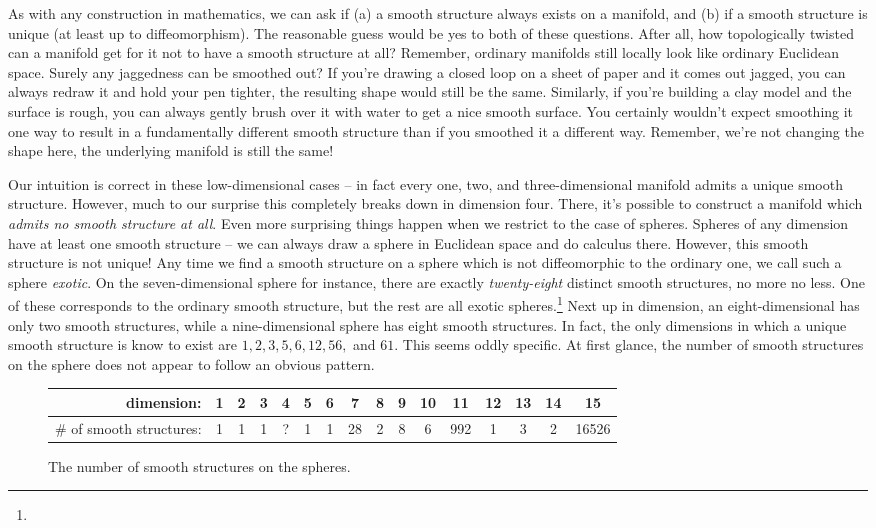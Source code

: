 As with any construction in mathematics, we can ask if (a) a smooth structure always exists on a manifold, and (b) if a smooth structure is unique (at least up to diffeomorphism). The reasonable guess would be yes to both of these questions. After all, how topologically twisted can a manifold get for it not to have a smooth structure at all? Remember, ordinary manifolds still locally look like ordinary Euclidean space. Surely any jaggedness can be smoothed out? If you're drawing a closed loop on a sheet of paper and it comes out jagged, you can always redraw it and hold your pen tighter, the resulting shape would still be the same. Similarly, if you're building a clay model and the surface is rough, you can always gently brush over it with water to get a nice smooth surface. You certainly wouldn't expect smoothing it one way to result in a fundamentally different smooth structure than if you smoothed it a different way. Remember, we're not changing the shape here, the underlying manifold is still the same!

Our intuition is correct in these low-dimensional cases -- in fact every one, two, and three-dimensional manifold admits a unique smooth structure. However, much to our surprise this completely breaks down in dimension four. There, it's possible to construct a manifold which \emph{admits no smooth structure at all}. Even more surprising things happen when we restrict to the case of spheres. Spheres of any dimension have at least one smooth structure -- we can always draw a sphere in Euclidean space and do calculus there. However, this smooth structure is not unique!
Any time we find a smooth structure on a sphere which is not diffeomorphic to the ordinary one, we call such a sphere \emph{exotic}.
On the seven-dimensional sphere for instance, there are exactly \emph{twenty-eight} distinct smooth structures, no more no less.
One of these corresponds to the ordinary smooth structure, but the rest are all exotic spheres.\footnote{}
Next up in dimension, an eight-dimensional has only two smooth structures, while a nine-dimensional sphere has eight smooth structures. In fact, the only dimensions in which a unique smooth structure is know to exist are $1,2,3,5,6,12,56,$ and $61$. This seems oddly specific.
At first glance, the number of smooth structures on the sphere does not appear to follow an obvious pattern.
\begin{figure}[ht]
	\renewcommand{\arraystretch}{1.2}
	\centering
	\begin{tabular}{r|c|c|c|c|c|c|c|c|c|c|c|c|c|c|c}
		\textrm{dimension:}               & 1 & 2 & 3 & 4 & 5 & 6 & 7  & 8 & 9 & 10 & 11  & 12 & 13 & 14 & 15    \\
		\hline
		\textrm{\# of smooth structures:} & 1 & 1 & 1 & ? & 1 & 1 & 28 & 2 & 8 & 6  & 992 & 1  & 3  & 2  & 16526 \\
	\end{tabular}
	\medskip
	\caption{The number of smooth structures on the spheres.}
\end{figure}

